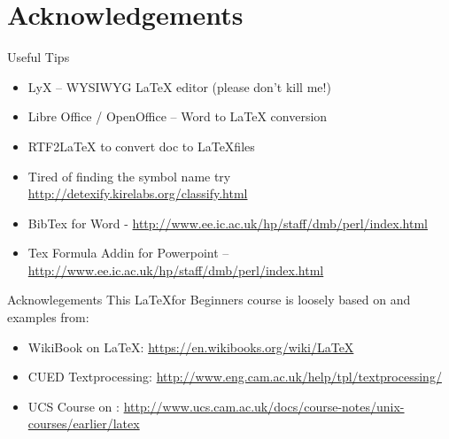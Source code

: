\documentclass[10pt,xcolor=table]{beamer}
\begin{document}
\section{Acknowledgements}
\begin{frame}{Useful Tips}
\begin{itemize}
\item LyX – WYSIWYG LaTeX editor (please don’t kill me!)
\item Libre Office / OpenOffice – Word to LaTeX conversion
\item RTF2LaTeX to convert doc to \LaTeX files
\item Tired of finding the symbol name try \href{http://detexify.kirelabs.org/classify.html}{http://detexify.kirelabs.org/classify.html}
\item BibTex for Word - \href{http://www.ee.ic.ac.uk/hp/staff/dmb/perl/index.html}{http://www.ee.ic.ac.uk/hp/staff/dmb/perl/index.html}
\item Tex Formula Addin for Powerpoint – \href{http://users.ecs.soton.ac.uk/srg/softwaretools/presentation/TeX4PPT/}{http://www.ee.ic.ac.uk/hp/staff/dmb/perl/index.html} 
\end{itemize}
\end{frame}

\begin{frame}{Acknowlegements}
This \LaTeX for Beginners course is loosely based on and examples from:
\begin{itemize}
\item WikiBook on \LaTeX: \href{https://en.wikibooks.org/wiki/LaTeX}{https://en.wikibooks.org/wiki/LaTeX}
\item CUED Textprocessing: \href{http://www.eng.cam.ac.uk/help/tpl/textprocessing/}{http://www.eng.cam.ac.uk/help/tpl/textprocessing/}
\item UCS Course on \LaTeXe: \href{http://www.ucs.cam.ac.uk/docs/course-notes/unix-courses/earlier/latex}{http://www.ucs.cam.ac.uk/docs/course-notes/unix-courses/earlier/latex}
\end{itemize}
\end{frame}
\end{document}
